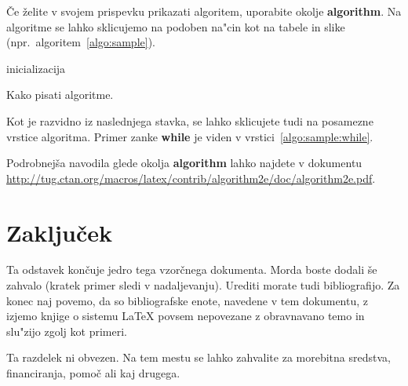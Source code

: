 \documentclass[sigconf,nonacm]{acmart}
\begin{document}
Če želite v svojem prispevku prikazati algoritem, uporabite okolje
\textbf{algorithm}.  Na algoritme se lahko sklicujemo na podoben na"cin kot na
tabele in slike (npr.\ algoritem~\ref{algo:sample}).

\begin{algorithm}
    \SetAlgoLined
    inicializacija\;
    \caption{Kako pisati algoritme.}
    \label{algo:sample}
\end{algorithm}

Kot je razvidno iz naslednjega stavka, se lahko sklicujete tudi na posamezne
vrstice algoritma.  Primer zanke \textbf{while} je viden v
vrstici~\ref{algo:sample:while}.

Podrobnejša navodila glede okolja
\textbf{algorithm} lahko najdete v dokumentu
\url{http://tug.ctan.org/macros/latex/contrib/algorithm2e/doc/algorithm2e.pdf}.

\section{Zaključek}

Ta odstavek končuje jedro tega vzorčnega dokumenta.  Morda boste dodali še
zahvalo (kratek primer sledi v nadaljevanju).  Urediti morate tudi
bibliografijo.  Za konec naj povemo, da so bibliografske enote, navedene v tem
dokumentu, z izjemo knjige o sistemu \LaTeX{} povsem nepovezane z obravnavano
temo in slu"zijo zgolj kot primeri.

\begin{acks}
    Ta razdelek ni obvezen.  Na tem mestu se lahko zahvalite za morebitna
    sredstva, financiranja, pomoč ali kaj drugega.
\end{acks}



\end{document}
